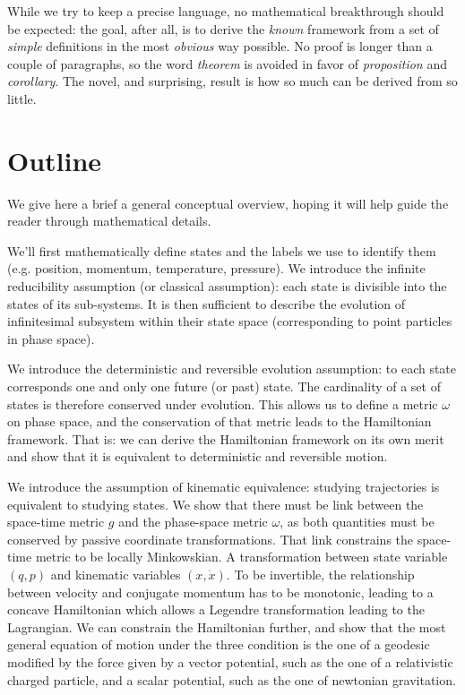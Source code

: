 \documentclass[aps,pra,10pt,twocolumn,floatfix,nofootinbib]{revtex4-1}
\theoremstyle{definition}
\begin{document}
While we try to keep a precise language, no mathematical breakthrough should be expected: the goal, after all, is to derive the \emph{known} framework from a set of \emph{simple} definitions in the most \emph{obvious} way possible. No proof is longer than a couple of paragraphs, so the word \emph{theorem} is avoided in favor of \emph{proposition} and \emph{corollary}. The novel, and surprising, result is how so much can be derived from so little.

\section{Outline}

We give here a brief a general conceptual overview, hoping it will help guide the reader through mathematical details.

We'll first mathematically define states and the labels we use to identify them (e.g. position, momentum, temperature, pressure). We introduce the infinite reducibility assumption (or classical assumption): each state is divisible into the states of its sub-systems. It is then sufficient to describe the evolution of infinitesimal subsystem within their state space (corresponding to point particles in phase space).

We introduce the deterministic and reversible evolution assumption: to each state corresponds one and only one future (or past) state. The cardinality of a set of states is therefore conserved under evolution. This allows us to define a metric $\omega$ on phase space, and the conservation of that metric leads to the Hamiltonian framework. That is: we can derive the Hamiltonian framework on its own merit and show that it is equivalent to deterministic and reversible motion.

We introduce the assumption of kinematic equivalence: studying trajectories is equivalent to studying states. We show that there must be link between the space-time metric $g$ and the phase-space metric $\omega$, as both quantities must be conserved by passive coordinate transformations. That link constrains the space-time metric to be locally Minkowskian. A transformation between state variable $(q, p)$ and kinematic variables $(x, \dot{x})$.  To be invertible, the relationship between velocity and conjugate momentum has to be monotonic, leading to a concave Hamiltonian which allows a Legendre transformation leading to the Lagrangian. We can constrain the Hamiltonian further, and show that the most general equation of motion under the three condition is the one of a geodesic modified by the force given by a vector potential, such as the one of a relativistic charged particle, and a scalar potential, such as the one of newtonian gravitation.
\end{document}
